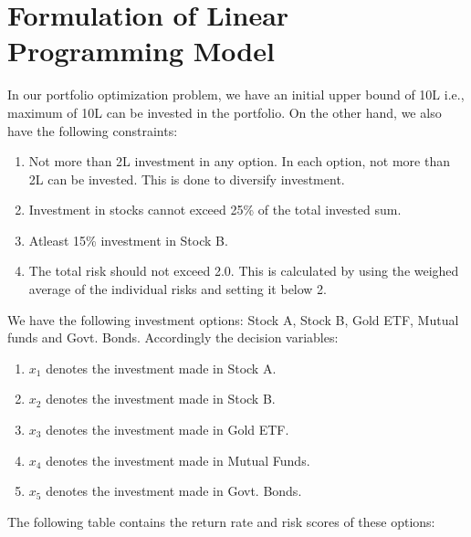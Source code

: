 \documentclass{article}
\begin{document}
\section{Formulation of Linear Programming Model}
In our portfolio optimization problem, we have an initial upper bound of 10L i.e., maximum of 10L can be invested in the portfolio. On the other hand, we also have the following  constraints:
\begin{enumerate}
\item Not more than 2L investment in any option. In each option, not more than 2L can be invested. This is done to diversify investment.
\item Investment in stocks cannot exceed 25\% of the total invested sum.
\item Atleast 15\% investment in Stock B.
\item The total risk should not exceed 2.0. This is calculated by using the weighed average of the individual risks and setting it below 2.
\end{enumerate}
We have the following investment options: Stock A, Stock B, Gold ETF, Mutual funds and Govt. Bonds.
Accordingly the decision variables:
\begin{enumerate}[label=\roman*.]
\item \(x_1\) denotes the investment made in Stock A.
\item \(x_2\) denotes the investment made in Stock B.
\item \(x_3\) denotes the investment made in Gold ETF.
\item \(x_4\) denotes the investment made in Mutual Funds.
\item \(x_5\) denotes the investment made in Govt. Bonds.
\end{enumerate}
The following table contains the return rate and risk scores of these options:
\end{document}
